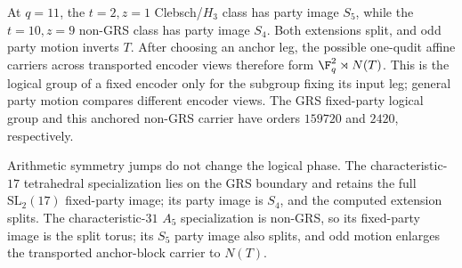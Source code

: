 At \(q=11\), the \(t=2,z=1\) Clebsch/\(H_3\) class has party image
\(S_5\), while the \(t=10,z=9\) non-GRS class has party image \(S_4\).
Both extensions split, and odd party motion inverts \(T\).
After choosing an anchor leg, the possible one-qudit affine carriers
across transported encoder views therefore form
\(\F_q^2\rtimes N(T)\).  This is the logical group of a fixed encoder
only for the subgroup fixing its input leg; general party motion compares
different encoder views.  The GRS fixed-party logical group and this
anchored non-GRS carrier have orders \(159720\) and \(2420\), respectively.

Arithmetic symmetry jumps do not change the logical phase.  The
characteristic-\(17\) tetrahedral specialization lies on the GRS boundary
and retains the full \(\mathrm{SL}_2(17)\) fixed-party image; its party
image is \(S_4\), and the computed extension splits.  The
characteristic-\(31\) \(A_5\) specialization is non-GRS, so its
fixed-party image is the split torus; its \(S_5\) party image also splits,
and odd motion enlarges the transported anchor-block carrier to \(N(T)\).
